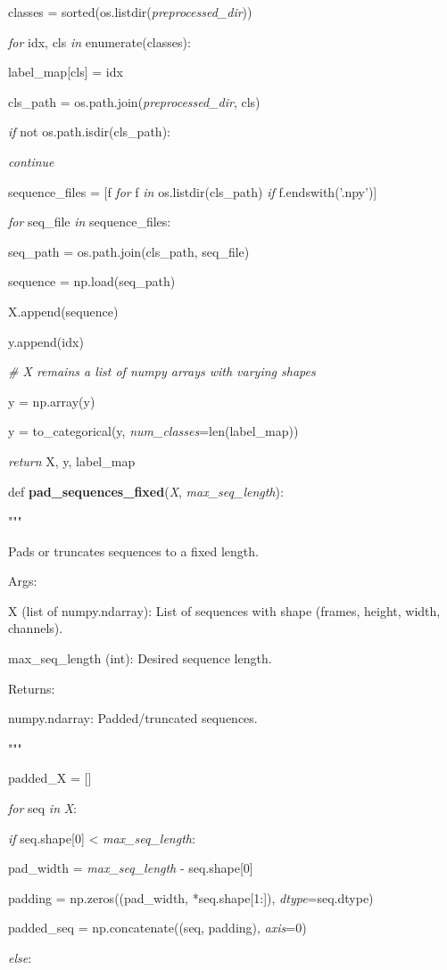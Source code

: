 \documentclass[
]{article}
\begin{document}
classes = sorted(os.listdir(\emph{preprocessed\_dir}))

\emph{for} idx, cls \emph{in} enumerate(classes):

label\_map{[}cls{]} = idx

cls\_path = os.path.join(\emph{preprocessed\_dir}, cls)

\emph{if} not os.path.isdir(cls\_path):

\emph{continue}

sequence\_files = {[}f \emph{for} f \emph{in} os.listdir(cls\_path) \emph{if} f.endswith('.npy'){]}

\emph{for} seq\_file \emph{in} sequence\_files:

seq\_path = os.path.join(cls\_path, seq\_file)

sequence = np.load(seq\_path)

X.append(sequence)

y.append(idx)

\emph{\# X remains a list of numpy arrays with varying shapes}

y = np.array(y)

y = to\_categorical(y, \emph{num\_classes}=len(label\_map))

\emph{return} X, y, label\_map

def \textbf{pad\_sequences\_fixed}(\emph{X}, \emph{max\_seq\_length}):

"""

Pads or truncates sequences to a fixed length.

Args:

X (list of numpy.ndarray): List of sequences with shape (frames, height, width, channels).

max\_seq\_length (int): Desired sequence length.

Returns:

numpy.ndarray: Padded/truncated sequences.

"""

padded\_X = {[}{]}

\emph{for} seq \emph{in} \emph{X}:

\emph{if} seq.shape{[}0{]} \textless{} \emph{max\_seq\_length}:

pad\_width = \emph{max\_seq\_length} - seq.shape{[}0{]}

padding = np.zeros((pad\_width, *seq.shape{[}1:{]}), \emph{dtype}=seq.dtype)

padded\_seq = np.concatenate((seq, padding), \emph{axis}=0)

\emph{else}:
\end{document}
